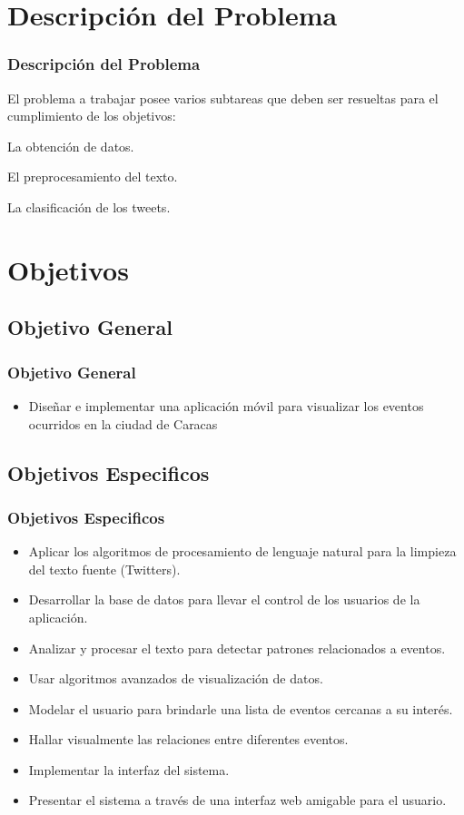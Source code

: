 \documentclass{beamer}
\begin{document}
\section{Descripci\'{o}n del Problema} 
\begin{frame}
\frametitle{Descripci\'{o}n del Problema}
El problema a trabajar posee varios subtareas que deben ser resueltas para el cumplimiento de los objetivos: 
\item La obtención de datos.
\item El preprocesamiento del texto.
\item La clasificación de los tweets.

\end{frame}
\section{Objetivos} 

\subsection{Objetivo General}
\begin{frame}
\frametitle{Objetivo General}
\begin{itemize}
\item Diseñar e implementar una aplicación móvil para visualizar los eventos ocurridos en la ciudad de Caracas
\end{itemize}
\end{frame}

\subsection{Objetivos Especificos}
\begin{frame}
\frametitle{Objetivos Especificos}
\begin{itemize}
\item Aplicar los algoritmos de procesamiento de lenguaje natural para la limpieza del texto fuente
(Twitters).
\item Desarrollar la base de datos para llevar el control de los usuarios de la aplicación.
\item Analizar y procesar el texto para detectar patrones relacionados a eventos.
\item Usar algoritmos avanzados de visualización de datos.
\item Modelar el usuario para brindarle una lista de eventos cercanas a su interés.
\item Hallar visualmente las relaciones entre diferentes eventos.
\item Implementar la interfaz del sistema.
\item Presentar el sistema a través de una interfaz web amigable para el usuario.
\end{itemize}

\end{frame}
\end{document}
